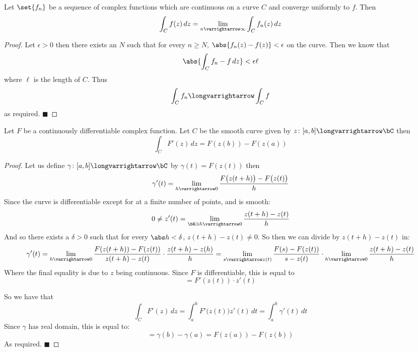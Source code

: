 \documentclass[10pt]{article}
\let\to=\varrightarrow
\let\longto=\longvarrightarrow
\def\qed{\hskip1cm\hbox{}\hfill$\blacksquare$}
\begin{document}


\bigskip

\begin{prop*}

    Let $\set{f_n}$ be a sequence of complex functions which are continuous on a curve $C$ and converge uniformly to $f$.
    Then
    \[ \int_C f(z)\,dz = \lim_{n\to\infty}\int_C f_n(z)\,dz \]

\end{prop*}

\begin{proof}

    Let $\epsilon>0$ then there exists an $N$ such that for every $n\geq N$, $\abs{f_n(z)-f(z)}<\epsilon$ on the curve.
    Then we know that
    \[ \abs{\int_C f_n-f\,dz} < \epsilon\ell \]
    where $\ell$ is the length of $C$.
    Thus
    \[ \int_C f_n \longto \int_C f \]
    as required.
    \qed

\end{proof}

\begin{prop*}

    Let $F$ be a continuously differentiable complex function.
    Let $C$ be the smooth curve given by $z\colon[a,b]\longto\bC$ then
    \[ \int_C F'(z)\,dz = F(z(b)) - F(z(a)) \]

\end{prop*}

\begin{proof}

    Let us define $\gamma\colon[a,b]\longto\bC$ by $\gamma(t)=F(z(t))$ then
    \[ \gamma'(t) = \lim_{h\to0}\frac{F\bigl(z(t+h)\bigr) - F\bigl(z(t)\bigr)}h \]
    Since the curve is differentiable except for at a finite number of points, and is smooth:
    \[ 0\neq z'(t) = \lim_{\bR\ni h\to0}\frac{z(t+h) - z(t)}h \]
    And so there exists a $\delta>0$ such that for every $\abs h<\delta$, $z(t+h)-z(t)\neq0$.
    So then we can divide by $z(t+h)-z(t)$ in:
    \[ \gamma'(t) = \lim_{h\to0}\frac{F(z(t+h)) - F(z(t))}{z(t+h)-z(t)}\cdot\frac{z(t+h) - z(h)}h = \lim_{s\to z(t)}\frac{F(s) - F(z(t))}{s-z(t)}\cdot\lim_{h\to0}\frac{z(t+h) - z(t)}h \]
    Where the final equality is due to $z$ being continuous.
    Since $F$ is differentiable, this is equal to
    \[ = F'(z(t))\cdot z'(t) \]

    So we have that
    \[ \int_C F'(z)\,dz = \int_a^b F'\bigl(z(t)\bigr)z'(t)\,dt = \int_a^b \gamma'(t)\,dt \]
    Since $\gamma$ has real domain, this is equal to:
    \[ = \gamma(b) - \gamma(a) = F(z(a)) - F(z(b)) \]
    As required.
    \qed

\end{proof}
\end{document}

